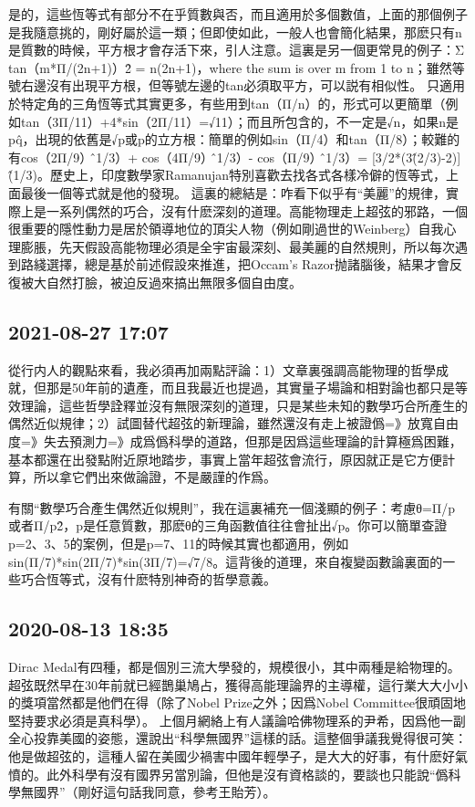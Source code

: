 \documentclass[twocolumn]{ctexart}
\begin{document}
是的，這些恆等式有部分不在乎質數與否，而且適用於多個數值，上面的那個例子是我隨意挑的，剛好屬於這一類；但即使如此，一般人也會簡化結果，那麽只有n是質數的時候，平方根才會存活下來，引人注意。這裏是另一個更常見的例子：Σ tan（m*Π/(2n+1)）\^2 = n(2n+1)，where the sum is over m from 1 to n；雖然等號右邊沒有出現平方根，但等號左邊的tan必須取平方，可以説有相似性。
只適用於特定角的三角恆等式其實更多，有些用到tan（Π/n）的，形式可以更簡單（例如tan（3Π/11）+4*sin（2Π/11）=√11）；而且所包含的，不一定是√n，如果n是p\^q，出現的依舊是√p或p的立方根：簡單的例如sin（Π/4）和tan（Π/8）；較難的有cos（2Π/9）\^（1/3）+ cos（4Π/9）\^（1/3）- cos（Π/9）\^（1/3）= [3/2*(3\^(2/3)-2)]\^(1/3)。歷史上，印度數學家Ramanujan特別喜歡去找各式各樣冷僻的恆等式，上面最後一個等式就是他的發現。
這裏的總結是：咋看下似乎有“美麗”的規律，實際上是一系列偶然的巧合，沒有什麽深刻的道理。高能物理走上超弦的邪路，一個很重要的隱性動力是居於領導地位的頂尖人物（例如剛過世的Weinberg）自我心理膨脹，先天假設高能物理必須是全宇宙最深刻、最美麗的自然規則，所以每次遇到路綫選擇，總是基於前述假設來推進，把Occam's Razor抛諸腦後，結果才會反復被大自然打臉，被迫反過來搞出無限多個自由度。
\subsection*{2021-08-27 17:07}

從行内人的觀點來看，我必須再加兩點評論：1）文章裏强調高能物理的哲學成就，但那是50年前的遺產，而且我最近也提過，其實量子場論和相對論也都只是等效理論，這些哲學詮釋並沒有無限深刻的道理，只是某些未知的數學巧合所產生的偶然近似規律；2）試圖替代超弦的新理論，雖然還沒有走上被證僞=》放寬自由度=》失去預測力=》成爲僞科學的道路，但那是因爲這些理論的計算極爲困難，基本都還在出發點附近原地踏步，事實上當年超弦會流行，原因就正是它方便計算，所以拿它們出來做論證，不是嚴謹的作爲。

有關“數學巧合產生偶然近似規則”，我在這裏補充一個淺顯的例子：考慮θ=Π/p或者Π/p\^2，p是任意質數，那麽θ的三角函數值往往會扯出√p。你可以簡單查證p=2、3、5的案例，但是p=7、11的時候其實也都適用，例如sin(Π/7)*sin(2Π/7)*sin(3Π/7)=√7/8。這背後的道理，來自複變函數論裏面的一些巧合恆等式，沒有什麽特別神奇的哲學意義。
\subsection*{2020-08-13 18:35}

Dirac Medal有四種，都是個別三流大學發的，規模很小，其中兩種是給物理的。超弦既然早在30年前就已經鵲巢鳩占，獲得高能理論界的主導權，這行業大大小小的獎項當然都是他們在得（除了Nobel Prize之外；因爲Nobel Committee很頑固地堅持要求必須是真科學）。
上個月網絡上有人議論哈佛物理系的尹希，因爲他一副全心投靠美國的姿態，還說出“科學無國界”這樣的話。這整個爭議我覺得很可笑：他是做超弦的，這種人留在美國少禍害中國年輕學子，是大大的好事，有什麽好氣憤的。此外科學有沒有國界另當別論，但他是沒有資格談的，要談也只能說“僞科學無國界”（剛好這句話我同意，參考王貽芳）。
\end{document}
